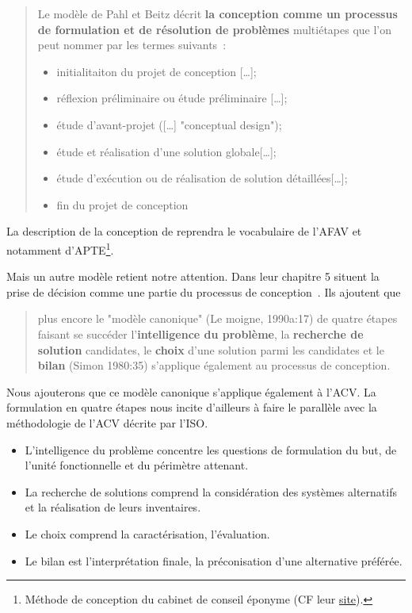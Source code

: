 \blockcquote[p.124-128, emphase personnelle]{micaelli_artificialisme:_2003}{
Le modèle de Pahl et Beitz décrit \textbf{la conception comme un processus de formulation et de résolution de problèmes} multiétapes que l'on peut nommer par les termes suivants~:
	\begin{itemize}
\item initialitaiton du projet de conception [\ldots];
\item réflexion préliminaire ou étude préliminaire [\ldots];
\item étude d'avant-projet ([\ldots] "conceptual design");
\item étude et réalisation d'une solution globale[\ldots];
\item étude d'exécution ou de réalisation de solution détaillées[\ldots];
\item fin du projet de conception
	\end{itemize}
}
La description de la conception de \citeauthor{micaelli_artificialisme:_2003} reprendra le vocabulaire de l'\gls{AFAV} et notamment d'APTE\footnote{Méthode de conception du cabinet de conseil éponyme (CF leur \href{http://methode-apte.com/}{site}).}.

Mais un autre modèle retient notre attention.
Dans leur chapitre 5 \citeauthor{micaelli_artificialisme:_2003} situent la prise de décision comme une partie du processus de conception~\cite[p.81]{micaelli_artificialisme:_2003}.
Ils ajoutent que 
\blockcquote[p.82]{micaelli_artificialisme:_2003}{
plus encore le "modèle canonique" (Le moigne, 1990a:17) de quatre étapes faisant se succéder l'\textbf{intelligence du problème}, la \textbf{recherche de solution} candidates, le \textbf{choix} d'une solution parmi les candidates et le \textbf{bilan} (Simon 1980:35) s'applique également au processus de conception.
}
Nous ajouterons que ce modèle canonique s'applique également à l'\gls{ACV}.
La formulation en quatre étapes nous incite d'ailleurs à faire le parallèle avec la méthodologie de l'\gls{ACV} décrite par l'\gls{ISO}.
\begin{itemize}
\item L'intelligence du problème concentre les questions de formulation du but, de l'unité fonctionnelle et du périmètre attenant.
\item La recherche de solutions comprend la considération des systèmes alternatifs et la réalisation de leurs inventaires.
\item Le choix comprend la caractérisation, l'évaluation.
\item Le bilan est l'interprétation finale, la préconisation d'une alternative préférée.
\end{itemize}


